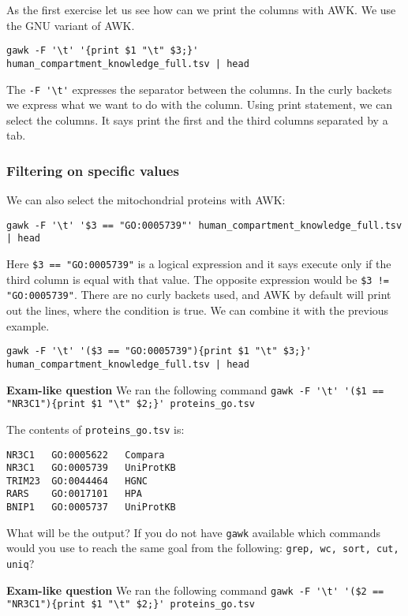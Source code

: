 \documentclass{article}\usepackage[]{graphicx}\usepackage[usenames,dvipsnames]{color}
\begin{document}
As the first exercise let us see how can we print the columns with AWK. We use the GNU variant of AWK.

\begin{verbatim}
gawk -F '\t' '{print $1 "\t" $3;}' human_compartment_knowledge_full.tsv | head
\end{verbatim}

The \verb+-F '\t'+ expresses the separator between the columns. In the curly backets we express what we want to do with the column. Using print statement, we can select the columns. It says print the first and the third columns separated by a tab.

\subsubsection*{Filtering on specific values}

We can also select the mitochondrial proteins with AWK:

\begin{verbatim}
gawk -F '\t' '$3 == "GO:0005739"' human_compartment_knowledge_full.tsv | head
\end{verbatim}

Here \verb+$3 == "GO:0005739"+ is a logical expression and it says execute only if the third column is equal with that value. The opposite expression would be \verb+$3 != "GO:0005739"+. There are no curly backets used, and AWK by default will print out the lines, where the condition is true. We can combine it with the previous example.

\begin{verbatim}
gawk -F '\t' '($3 == "GO:0005739"){print $1 "\t" $3;}' human_compartment_knowledge_full.tsv | head
\end{verbatim}

\textbf{Exam-like question} We ran the following command \verb+gawk -F '\t' '($1 == "NR3C1"){print $1 "\t" $2;}' proteins_go.tsv+

The contents of \verb+proteins_go.tsv+ is:
\begin{verbatim}
NR3C1   GO:0005622   Compara
NR3C1   GO:0005739   UniProtKB
TRIM23  GO:0044464   HGNC
RARS    GO:0017101   HPA
BNIP1   GO:0005737   UniProtKB
\end{verbatim}

What will be the output? If you do not have \verb+gawk+ available which commands would you use to reach the same goal from the following: \verb+grep, wc, sort, cut, uniq+?

\textbf{Exam-like question} We ran the following command \verb+gawk -F '\t' '($2 == "NR3C1"){print $1 "\t" $2;}' proteins_go.tsv+
\end{document}
